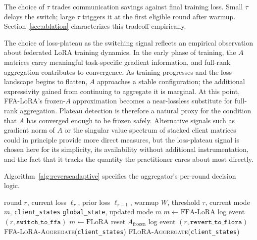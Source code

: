 The choice of $\tau$ trades communication savings against final training loss. Small $\tau$ delays the switch; large $\tau$ triggers it at the first eligible round after warmup. Section~\ref{sec:ablation} characterizes this tradeoff empirically.

The choice of loss-plateau as the switching signal reflects an empirical observation about federated LoRA training dynamics. In the early phase of training, the $A$ matrices carry meaningful task-specific gradient information, and full-rank aggregation contributes to convergence. As training progresses and the loss landscape begins to flatten, $A$ approaches a stable configuration; the additional expressivity gained from continuing to aggregate it is marginal. At this point, FFA-LoRA's frozen-$A$ approximation becomes a near-lossless substitute for full-rank aggregation. Plateau detection is therefore a natural proxy for the condition that $A$ has converged enough to be frozen safely. Alternative signals such as gradient norm of $A$ or the singular value spectrum of stacked client matrices could in principle provide more direct measures, but the loss-plateau signal is chosen here for its simplicity, its availability without additional instrumentation, and the fact that it tracks the quantity the practitioner cares about most directly.

Algorithm~\ref{alg:reverseadaptive} specifies the aggregator's per-round decision logic.

\begin{algorithm}[t]
\caption{ReverseAdaptive aggregator (per round)}
\label{alg:reverseadaptive}
\begin{algorithmic}[1]
\Require round $r$, current loss $\ell_r$, prior loss $\ell_{r-1}$,
         warmup $W$, threshold $\tau$, current mode $m$, \texttt{client\_states}
\Ensure \texttt{global\_state}, updated mode $m$
    \State $m \leftarrow \text{FFA-LoRA}$
    \State log event $(r, \texttt{switch\_to\_ffa})$
 
    \State $m \leftarrow \text{FLoRA}$
    \State reset $A_{\text{frozen}}$
    \State log event $(r, \texttt{revert\_to\_flora})$
\EndIf
{}
    \State \Return \textsc{FFA-LoRA-Aggregate}(\texttt{client\_states})
\Else
    \State \Return \textsc{FLoRA-Aggregate}(\texttt{client\_states})
\EndIf
\end{algorithmic}
\end{algorithm}

